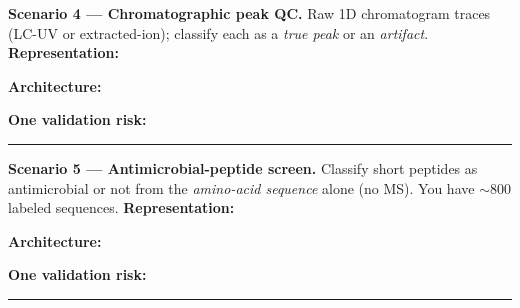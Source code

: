 \documentclass[11pt]{article}
\newif\ifsolution
\newcommand{\keybox}[1]{\ifsolution\par\vspace{2pt}%
  \fbox{\parbox{0.965\textwidth}{\small\textbf{Suggested answer.}\; #1}}\par\fi}
\newcommand{\work}[1]{\ifsolution\else\vspace{#1}\fi}
\newcommand{\fillrow}[2]{\textbf{#1:}\ \ifsolution\textbf{#2}\else\hrulefill\fi\par}
\begin{document}
\textbf{Scenario 4 --- Chromatographic peak QC.}\; {\small Raw 1D chromatogram traces (LC-UV or extracted-ion);
classify each as a \emph{true peak} or an \emph{artifact}.}
\vspace{2pt}
\fillrow{Representation}{raw 1D signal resampled to a fixed-length trace (dense 1D)}\work{0.35cm}
\fillrow{Architecture}{1D CNN (Lecture 5)}\work{0.35cm}
\fillrow{One validation risk}{reagent-lot / column change / retention-time drift over time --- validate temporally on later runs}\work{0.35cm}
\keybox{A dense, ordered 1D signal $\to$ \textbf{resampled intensity trace} $\to$ \textbf{1D CNN} (chart row 1, same family as Scenario 1).
\textbf{Risk:} \emph{temporal} drift --- reagent lots, columns, and retention times change over time, so validate on \emph{later} runs
(temporal validation), not just a random split of today's data.}

\vspace{2pt}\hrule\vspace{4pt}

\textbf{Scenario 5 --- Antimicrobial-peptide screen.}\; {\small Classify short peptides as antimicrobial or not from the
\emph{amino-acid sequence} alone (no MS). You have $\sim$800 labeled sequences.}
\vspace{2pt}
\fillrow{Representation}{token sequence --- one token per residue + positional encoding}\work{0.35cm}
\fillrow{Architecture}{Transformer --- fine-tune a pretrained protein language model (ESM-2), Lecture 7/8}\work{0.35cm}
\fillrow{One validation risk}{only 800 labels (overfitting) and sequence-homology leakage --- split by sequence identity, validate externally}\work{0.35cm}
\keybox{A token sequence $\to$ \textbf{one token/residue + position} $\to$ \textbf{Transformer} (chart row 4). With only 800 labels, \emph{fine-tune
a pretrained} protein language model rather than train from scratch (Lecture 8 transfer learning). \textbf{Risk:} few labels overfit, and
\emph{homologous} sequences leak between splits --- cluster by sequence identity and validate on a held-out cluster.}

\vspace{2pt}\hrule\vspace{4pt}
\end{document}
